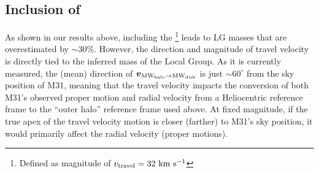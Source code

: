 \documentclass[twocolumn]{aastex631}
\newcommand{\bov}{\ensuremath{\boldsymbol{v}}}
\newcommand{\vel}[2]{\ensuremath{\bov_{\rm #1 \to #2}}}
\newcommand{\mwouter}{\ensuremath{\textrm{MW}_\textrm{halo}}}
\newcommand{\mwdisk}{\ensuremath{\textrm{MW}_\textrm{disk}}}
\begin{document}
\subsection{Inclusion of }

As shown in our results above, including the \footnote{Defined
as \todo{$\vel{\mwouter}{\mwdisk}$ above.} magnitude of $v_\textrm{travel} = 32~\mathrm{km}~\mathrm{s}^{-1}$}
\citep{Petersen2021} leads to LG masses that are overestimated by $\sim30\%$.
However, the direction and magnitude of travel velocity is directly tied to the
inferred mass of the Local Group.
As it is currently measured, the (mean) direction of $\vel{\mwouter}{\mwdisk}$
is just $\sim$$60^\circ$ from the sky position of M31, meaning that the travel
velocity impacts the conversion of both M31's observed proper motion and radial
velocity from a Heliocentric reference frame to the ``outer halo'' reference
frame used above.
At fixed magnitude, if the true apex of the travel velocity motion is closer
(farther) to M31's sky position, it would primarily affect the radial velocity
(proper motions).


\end{document}
